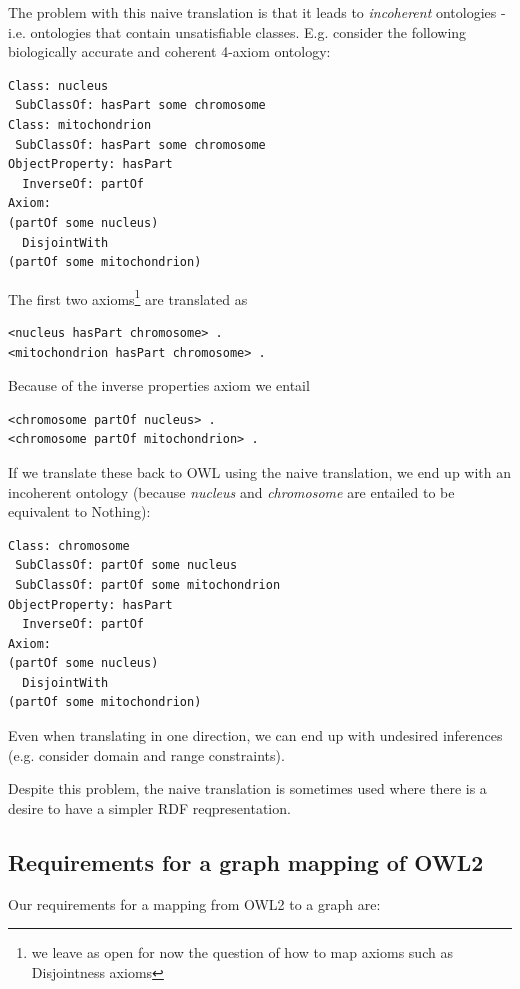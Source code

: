 \documentclass{my}
\begin{document}
The problem with this naive translation is that it leads to
\emph{incoherent} ontologies - i.e. ontologies that contain
unsatisfiable classes. E.g. consider the following biologically
accurate and coherent 4-axiom ontology:

\begin{verbatim}
Class: nucleus
 SubClassOf: hasPart some chromosome
Class: mitochondrion 
 SubClassOf: hasPart some chromosome
ObjectProperty: hasPart
  InverseOf: partOf
Axiom:
(partOf some nucleus) 
  DisjointWith 
(partOf some mitochondrion)
\end{verbatim}

The first two axioms\footnote{we leave as open for now the question of
  how to map axioms such as Disjointness axioms} are translated as

\begin{verbatim}
<nucleus hasPart chromosome> .
<mitochondrion hasPart chromosome> .
\end{verbatim}

Because of the inverse properties axiom we entail

\begin{verbatim}
<chromosome partOf nucleus> .
<chromosome partOf mitochondrion> .
\end{verbatim}

If we translate these back to OWL using the naive translation, we end
up with an incoherent ontology (because \emph{nucleus} and
\emph{chromosome} are entailed to be equivalent to Nothing):

\begin{verbatim}
Class: chromosome
 SubClassOf: partOf some nucleus
 SubClassOf: partOf some mitochondrion
ObjectProperty: hasPart
  InverseOf: partOf
Axiom:
(partOf some nucleus) 
  DisjointWith 
(partOf some mitochondrion)
\end{verbatim}

Even when translating in one direction, we can end up with undesired
inferences (e.g. consider domain and range constraints).

Despite this problem, the naive translation is sometimes used where
there is a desire to have a simpler RDF reqpresentation.

\subsection{Requirements for a graph mapping of OWL2}

Our requirements for a mapping from OWL2 to a graph are:
\end{document}
